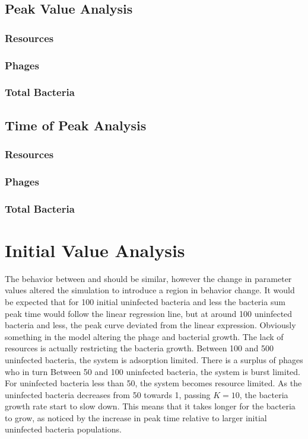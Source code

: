\subsection{Peak Value Analysis}
\subsubsection{Resources}

\subsubsection{Phages}
\subsubsection{Total Bacteria}

\subsection{Time of Peak Analysis}
\subsubsection{Resources}
\subsubsection{Phages}
\subsubsection{Total Bacteria}

\section{Initial Value Analysis}
The behavior between  and  should be similar, however the change in parameter values altered the simulation to introduce a region in behavior change. 
It would be expected that for 100 initial uninfected bacteria and less the bacteria sum peak time would follow the linear regression line, but at around 100 uninfected bacteria and less, the peak curve deviated from the linear expression. 
Obviously something in the model altering the phage and bacterial growth. 
The lack of resources is actually restricting the bacteria growth. 
Between 100 and 500 uninfected bacteria, the system is adsorption limited. 
There is a surplus of phages who in turn 
Between 50 and 100 uninfected bacteria, the system is burst limited. 
For uninfected bacteria less than 50, the system becomes resource limited. 
As the uninfected bacteria decreases from 50 towards 1, passing $K=10$, the bacteria growth rate start to slow down. 
This means that it takes longer for the bacteria to grow, as noticed by the increase in peak time relative to larger initial uninfected bacteria populations. 

